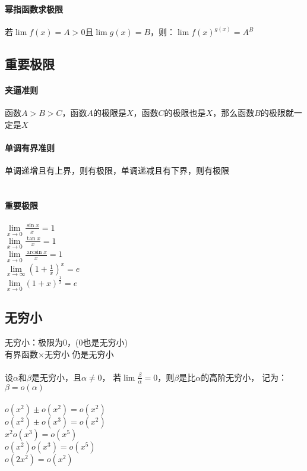 \documentclass{article}
\begin{document}
\begin{flushleft}
\paragraph{幂指函数求极限}
若$\lim f(x)=A>0$且$\lim g(x)=B$，则：$\lim f(x)^{g(x)}=A^B$\\

\subsection{重要极限}

\paragraph{夹逼准则}
函数$A>B>C$，函数$A$的极限是$X$，函数$C$的极限也是$X$，那么函数$B$的极限就一定是$X$\\
\paragraph{单调有界准则}
单调递增且有上界，则有极限，单调递减且有下界，则有极限\\
~\\
\paragraph{重要极限}
$\lim\limits_{x\to 0} \frac{\sin x}{x}=1$\\
$\lim\limits_{x\to 0} \frac{\tan x}{x}=1$\\
$\lim\limits_{x\to 0} \frac{\arcsin x}{x}=1$\\
$\lim\limits_{x\to \infty} (1+\frac{1}{x})^x=e$\\
$\lim\limits_{x\to 0} (1+x)^{\frac{1}{x}}=e$\\

\subsection{无穷小}

无穷小：极限为0，(0也是无穷小)\\
有界函数$\times$无穷小 仍是无穷小\\
~\\
设$\alpha$和$\beta$是无穷小，且$\alpha \neq 0$，
若$\lim \frac{\beta}{\alpha}=0$，则$\beta$是比$\alpha$的高阶无穷小，
记为：$\beta = o(\alpha)$\\
~\\
$o(x^2)\pm o(x^2)=o(x^2)$\\
$o(x^2)\pm o(x^3)=o(x^2)$\\
$x^2 o(x^3)=o(x^5)$\\
$o(x^2) o(x^3)=o(x^5)$\\
$o(2x^2)=o(x^2)$\\


\end{flushleft}
\end{document}
